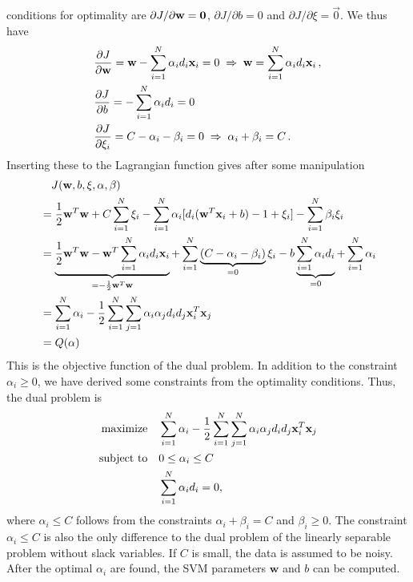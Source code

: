 \begin{enumerate}
\begin{solution}
    conditions for optimality are $\partial J/\partial \mathbf{w} = \mathbf{0}$,
    $\partial J/\partial b = 0$ and $\partial J/\partial \xi =
    \vec{0}$.  We thus have
    \begin{align*}
      &\frac{\partial J}{\partial \mathbf{w}} = \mathbf{w} - \sum_{i=1}^N \alpha_i d_i
      \mathbf{x}_i = 0 \; \Rightarrow \; \mathbf{w} = \sum_{i=1}^N \alpha_i d_i \mathbf{x}_i
      \, ,
      \\
      &\frac{\partial J}{\partial b} = - \sum_{i=1}^N \alpha_i d_i = 0
      \,
      \\
      &\frac{\partial J}{\partial \xi_i} = C - \alpha_i - \beta_i = 0
      \; \Rightarrow \; \alpha_i + \beta_i = C \, .
    \end{align*}
    Inserting these to the Lagrangian function gives after some
    manipulation
    \begin{align*}
      &\quad J(\mathbf{w}, b, \xi, \alpha, \beta)
      \\
      &= \frac{1}{2}\mathbf{w}^T\mathbf{w} + C \sum_{i=1}^N \xi_i - \sum_{i=1}^N
      \alpha_i[d_i(\mathbf{w}^T \mathbf{x}_i + b) - 1 + \xi_i] - \sum_{i=1}^N \beta_i
      \xi_i
      \\
      &= \underbrace{\frac{1}{2}\mathbf{w}^T\mathbf{w} - \mathbf{w}^T \sum_{i=1}^N \alpha_i
        d_i \mathbf{x}_i}_{=-\frac{1}{2}\mathbf{w}^T\mathbf{w}} +
      \sum_{i=1}^N\underbrace{(C-\alpha_i-\beta_i)}_{=0}\xi_i - b
      \underbrace{\sum_{i=1}^N\alpha_i d_i}_{=0} + \sum_{i=1}^N
      \alpha_i
      \\
      &= \sum_{i=1}^N \alpha_i - \frac{1}{2} \sum_{i=1}^N
      \sum_{j=1}^N \alpha_i \alpha_j d_i d_j \mathbf{x}_i^T \mathbf{x}_j
      \\
      &= Q(\alpha)
    \end{align*}
    This is the objective function of the dual problem.  In addition
    to the constraint $\alpha_i\geq 0$, we have derived some constraints from
    the optimality conditions.  Thus, the dual problem is
    \begin{align*}
      \text{maximize} &\quad \sum_{i=1}^N \alpha_i - \frac{1}{2} \sum_{i=1}^N
      \sum_{j=1}^N \alpha_i \alpha_j d_i d_j \mathbf{x}_i^T \mathbf{x}_j
      \\
      \text{subject to} &\quad 0 \leq \alpha_i \leq C
      \\
      &\quad \sum_{i=1}^N \alpha_i d_i = 0,
    \end{align*}
    where $\alpha_i \leq C$ follows from the constraints $\alpha_i +
    \beta_i = C$ and $\beta_i \geq 0$.  The constraint $\alpha_i \leq
    C$ is also the only difference to the dual problem of the linearly
    separable problem without slack variables.  If $C$ is small, the
    data is assumed to be noisy.  After the optimal $\alpha_i$ are
    found, the SVM parameters $\mathbf{w}$ and $b$ can be computed.


\end{solution}
\end{enumerate}
